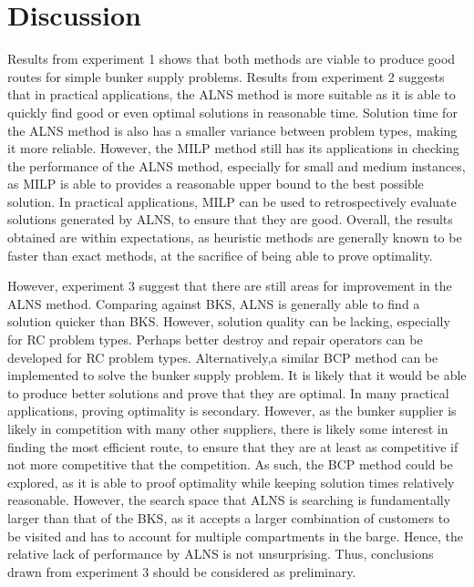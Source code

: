 \section{Discussion}
Results from experiment 1 shows that both methods are viable to produce good routes for simple bunker supply problems. Results from experiment 2 suggests that in practical applications, the ALNS method is more suitable as it is able to quickly find good or even optimal solutions in reasonable time. Solution time for the ALNS method is also has a smaller variance between problem types, making it more reliable. However, the MILP method still has its applications in checking the performance of the ALNS method, especially for small and medium instances, as MILP is able to provides a reasonable upper bound to the best possible solution. In practical applications, MILP can be used to retrospectively evaluate solutions generated by ALNS, to ensure that they are good. Overall, the results obtained are within expectations, as heuristic methods are generally known to be faster than exact methods, at the sacrifice of being able to prove optimality.

However, experiment 3 suggest that there are still areas for improvement in the ALNS method. Comparing against BKS, ALNS is generally able to find a solution quicker than BKS. However, solution quality can be lacking, especially for RC problem types. Perhaps better destroy and repair operators can be developed for RC problem types. Alternatively,a similar BCP method can be implemented to solve the bunker supply problem. It is likely that it would be able to produce better solutions and prove that they are optimal. In many practical applications, proving optimality is secondary. However, as the bunker supplier is likely in competition with many other suppliers, there is likely some interest in finding the most efficient route, to ensure that they are at least as competitive if not more competitive that the competition. As such, the BCP method could be explored, as it is able to proof optimality while keeping solution times relatively reasonable. However, the search space that ALNS is searching is fundamentally larger than that of the BKS, as it accepts a larger combination of customers to be visited and has to account for multiple compartments in the barge. Hence, the relative lack of performance by ALNS is not unsurprising. Thus, conclusions drawn from experiment 3 should be considered as preliminary.